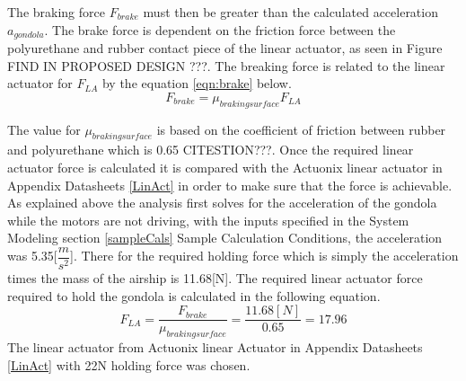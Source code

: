 \documentclass[../main.tex]{subfiles}
\begin{document}
The braking force $F_{brake}$ must then be greater than the calculated acceleration $a_{gondola}$. The brake force is dependent on the friction force between the polyurethane and rubber contact piece of the linear actuator, as seen in Figure FIND IN PROPOSED DESIGN ???.  The breaking force is related to the linear actuator for $F_{LA}$ by the equation \ref{eqn:brake} below.
\begin{equation}
\label{eqn:brake}
F_{brake} = \mu_{braking surface} F_{LA}
\end{equation}

The value for $\mu_{braking surface}$ is based on the coefficient of friction between rubber and polyurethane which is 0.65 CITESTION???. Once the required linear actuator force is calculated it is compared with the Actuonix linear actuator in Appendix Datasheets \ref{LinAct} in order to make sure that the force is achievable.\\

As explained above the analysis first solves for the acceleration of the gondola while the motors are not driving, with the inputs specified in the System Modeling section \ref{sampleCals} Sample Calculation Conditions, the acceleration was 5.35[$\dfrac{m}{s^2}$]. There for the required holding force which is simply the acceleration times the mass of the airship is 11.68[N]. The required linear actuator force required to hold the gondola is calculated in the following equation.
\begin{equation}
\label{eqn:brake}
F_{LA} = \frac{F_{brake}}{\mu_{braking surface} } = \frac{11.68[N]}{0.65} = 17.96
\end{equation}
The linear actuator from Actuonix linear Actuator in Appendix Datasheets \ref{LinAct} with 22N holding force was chosen. 
\end{document}
